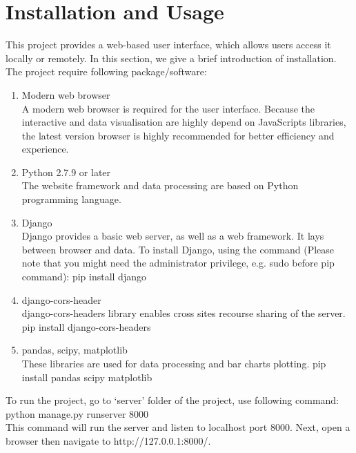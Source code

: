 \documentclass[11pt,letter]{article}
\begin{document}
\section {Installation and Usage}

This project provides a web-based user interface, which allows users access it locally or remotely. In this section, we give a brief introduction of installation. \\
The project require following package/software: \\
\begin{enumerate}
\item Modern web browser\\
A modern web browser is required for the user interface. Because the interactive and data visualisation are highly depend on JavaScripts libraries, the latest version browser is highly recommended for better efficiency and experience.\\
\item Python 2.7.9 or later\\
The website framework and data processing are based on Python programming language.\\
\item Django\\
Django provides a basic web server, as well as a web framework. It lays between browser and data. To install Django, using the command (Please note that you might need the administrator privilege, e.g. sudo before pip command):
pip install django\\
\item django-cors-header\\
django-cors-headers library enables cross sites recourse sharing of the server.
pip install django-cors-headers\\
\item pandas, scipy, matplotlib\\
These libraries are used for data processing and bar charts plotting.
pip install pandas scipy matplotlib\\


\end{enumerate}
To run the project, go to ‘server’ folder of the project, use following command: \\
python manage.py runserver 8000 \\
This command will run the server and listen to localhost port 8000. Next, open a browser then navigate to http://127.0.0.1:8000/. \\
\end{document}
